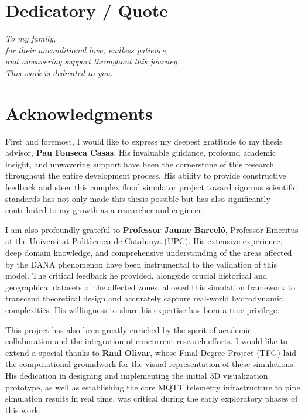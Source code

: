 \chapter*{Dedicatory / Quote}

\large\textit{To my family,\\
for their unconditional love, endless patience,\\
and unwavering support throughout this journey.\\
This work is dedicated to you.}

\chapter*{Acknowledgments}

First and foremost, I would like to express my deepest gratitude to my thesis advisor, \textbf{Pau Fonseca Casas}. His invaluable guidance, 
profound academic insight, and unwavering support have been the cornerstone of this research throughout the entire development process. 
His ability to provide constructive feedback and steer this complex flood simulator project toward rigorous scientific standards has not 
only made this thesis possible but has also significantly contributed to my growth as a researcher and engineer.

I am also profoundly grateful to \textbf{Professor Jaume Barceló}, Professor Emeritus at the Universitat Politècnica de Catalunya (UPC). 
His extensive experience, deep domain knowledge, and comprehensive understanding of the areas affected by the DANA phenomenon have been 
instrumental to the validation of this model. The critical feedback he provided, alongside crucial historical and geographical datasets of 
the affected zones, allowed this simulation framework to transcend theoretical design and accurately capture real-world hydrodynamic 
complexities. His willingness to share his expertise has been a true privilege.

This project has also been greatly enriched by the spirit of academic collaboration and the integration of concurrent research efforts. I 
would like to extend a special thanks to \textbf{Raul Olivar}, whose Final Degree Project (TFG) laid the computational groundwork for the 
visual representation of these simulations. His dedication in designing and implementing the initial 3D visualization prototype, as well 
as establishing the core MQTT telemetry infrastructure to pipe simulation results in real time, was critical during the early exploratory 
phases of this work.

